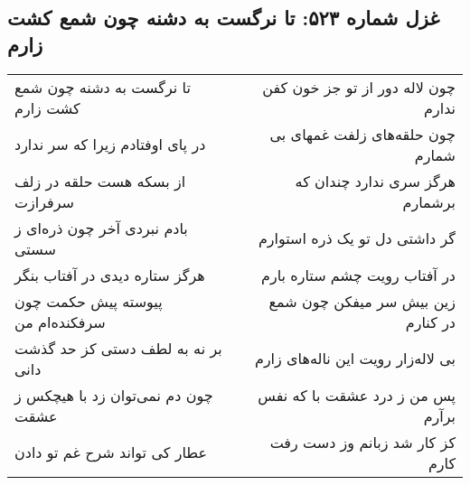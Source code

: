 \begin{center}
\section*{غزل شماره ۵۲۳: تا نرگست به دشنه چون شمع کشت زارم}
\label{sec:523}
\begin{longtable}{l p{0.5cm} r}
تا نرگست به دشنه چون شمع کشت زارم
&&
چون لاله دور از تو جز خون کفن ندارم
\\
در پای اوفتادم زیرا که سر ندارد
&&
چون حلقه‌های زلفت غمهای بی شمارم
\\
از بسکه هست حلقه در زلف سرفرازت
&&
هرگز سری ندارد چندان که برشمارم
\\
بادم نبردی آخر چون ذره‌ای ز سستی
&&
گر داشتی دل تو یک ذره استوارم
\\
هرگز ستاره دیدی در آفتاب بنگر
&&
در آفتاب رویت چشم ستاره بارم
\\
پیوسته پیش حکمت چون سرفکنده‌ام من
&&
زین بیش سر میفکن چون شمع در کنارم
\\
بر نه به لطف دستی کز حد گذشت دانی
&&
بی لاله‌زار رویت این ناله‌های زارم
\\
چون دم نمی‌توان زد با هیچکس ز عشقت
&&
پس من ز درد عشقت با که نفس برآرم
\\
عطار کی تواند شرح غم تو دادن
&&
کز کار شد زبانم وز دست رفت کارم
\\
\end{longtable}
\end{center}
